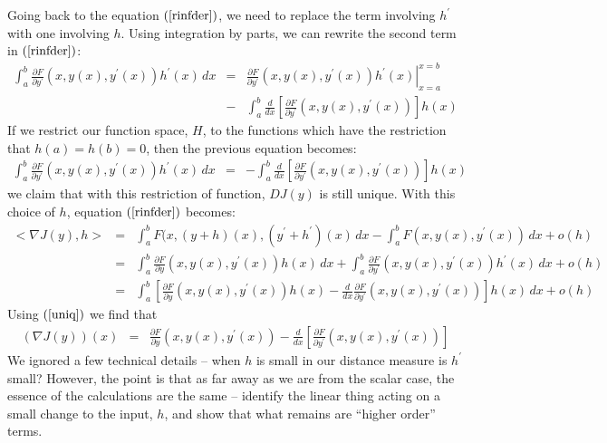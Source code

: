 \documentclass{article}
\begin{document}
Going back to the equation $(\ref{rinfder})$, we need to replace the term involving
$h^\prime$ with one involving $h$. Using integration by parts, we can rewrite the
second term in $(\ref{rinfder})$:
\begin{eqnarray}
\int_a^b \frac{\partial F}{\partial y^\prime}(x, y(x), y^\prime(x))h^\prime(x) \, dx
& = &
\left. \frac{\partial F}{\partial y^\prime}(x, y(x), y^\prime(x))
  h^\prime(x)\right|_{x=a}^{x=b} \nonumber \\
& - & \int_a^b \frac{d}{dx}
\left[
  \frac{\partial F}{\partial y^\prime}(x, y(x), y^\prime(x))
  \right]
  h(x)
\end{eqnarray}
If we restrict our function space, $H$, to the functions
which have the restriction that $h(a) = h(b) = 0$, then
the previous equation becomes:
\begin{eqnarray}
\int_a^b \frac{\partial F}{\partial y^\prime}(x, y(x), y^\prime(x))h^\prime(x) \, dx
& = &  - \int_a^b \frac{d}{dx}
\left[
  \frac{\partial F}{\partial y^\prime}(x, y(x), y^\prime(x))
  \right]
  h(x)
\end{eqnarray}
we claim that with this restriction of function, $DJ(y)$ is still unique.
With this choice of $h$,
equation $(\ref{rinfder})$ becomes:
\begin{eqnarray}
  <\!\nabla J(y), h\!>  & = & \int_a^b F(x, (y+h)(x), (y^\prime + h^\prime)(x) \, dx
  - \int_a^b F(x, y(x), y^\prime(x)) \, dx  + o(h) \nonumber \\
  & = & \int_a^b \frac{\partial F}{\partial y}(x, y(x), y^\prime(x))h(x)\, dx
+ \int_a^b \frac{\partial F}{\partial y^\prime}(x, y(x), y^\prime(x))h^\prime(x) \, dx
+ o(h) \nonumber \\
& = & \int_a^b \left[ \frac{\partial F}{\partial y}(x, y(x), y^\prime(x))h(x) -
\frac{d}{dx}\frac{\partial F}{\partial y^\prime}(x, y(x), y^\prime(x))\right]h(x)\, dx
+ o(h)
\end{eqnarray}
Using $(\ref{uniq})$ we find that
\begin{eqnarray}
  (\nabla J(y))(x) & = & \frac{\partial F}{\partial y}(x, y(x), y^\prime(x))
  - \frac{d}{dx} \left[ \frac{\partial F}{\partial y^\prime}(x, y(x), y^\prime(x))\right]
                         \label{risz_rep2}
\end{eqnarray}
We ignored a few technical details -- when $h$ is small in our distance measure is
$h^\prime$ small? However, the point is that as far away as we are from the scalar
case, the essence of the calculations are the same -- identify the linear thing
acting on a small change to the input, $h$, and show that what remains are
``higher order''{} terms.
\end{document}
